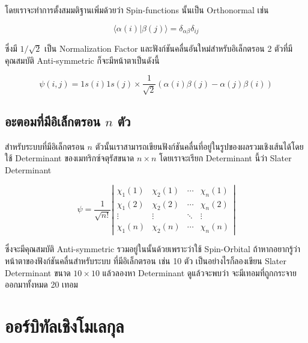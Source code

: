 \noindent โดยเราจะทำการตั้งสมมติฐานเพิ่มด้วยว่า Spin-functions นั้นเป็น Orthonormal เช่น

\begin{equation}
    \label{eq:Spin_function_orthogonality}
    \langle\alpha(i) | \beta(j)\rangle=\delta_{\alpha \beta} \delta_{i j}
\end{equation}

\noindent ซึ่งมี $1 / \sqrt{2}$ เป็น Normalization Factor และฟังก์ชันคลื่นอันใหม่สำหรับอิเล็กตรอน 2 ตัวที่มีคุณสมบัติ Anti-symmetric
ก็จะมีหน้าตาเป็นดังนี้

\begin{equation}
    \psi(i, j)
    =
    1 s(i) 1 s(j) \times \frac{1}{\sqrt{2}}(\alpha(i) \beta(j)-\alpha(j) \beta(i))
\end{equation}

\subsection{อะตอมที่มีอิเล็กตรอน $n$ ตัว}

สำหรับระบบที่มีอิเล็กตรอน $n$ ตัวนั้นเราสามารถเขียนฟังก์ชันคลื่นที่อยู่ในรูปของผลรวมเชิงเส้นได้โดยใช้ Determinant ของเมทริกซ์จตุรัสขนาด
$n \times n$ โดยเราจะเรียก Determinant นี้ว่า Slater Determinant

\begin{equation}
    \label{eq:Slater_determinant}
    \psi =
    \frac{1}{\sqrt{n !}}
    \left|
    \begin{array}{cccc}
        \chi_1(1) & \chi_2(1) & \cdots & \chi_n(1) \\
        \chi_1(2) & \chi_2(2) & \cdots & \chi_n(2) \\
        \vdots    & \vdots    & \ddots & \vdots    \\
        \chi_1(n) & \chi_2(n) & \cdots & \chi_n(n)
    \end{array}
    \right|
\end{equation}

\noindent ซึ่งจะมีคุณสมบัติ Anti-symmetric รวมอยู่ในนั้นด้วยเพราะว่าใช้ Spin-Orbital ถ้าหากอยากรู้ว่าหน้าตาของฟังก์ชันคลื่นสำหรับระบบ%
ที่มีอิเล็กตรอน เช่น 10 ตัว เป็นอย่างไรก็ลองเขียน Slater Determinant ขนาด $10 \times 10$ แล้วลองหา Determinant ดูแล้วจะพบว่า%
จะมีเทอมที่ถูกกระจายออกมาทั้งหมด 20 เทอม

\section{ออร์บิทัลเชิงโมเลกุล}

